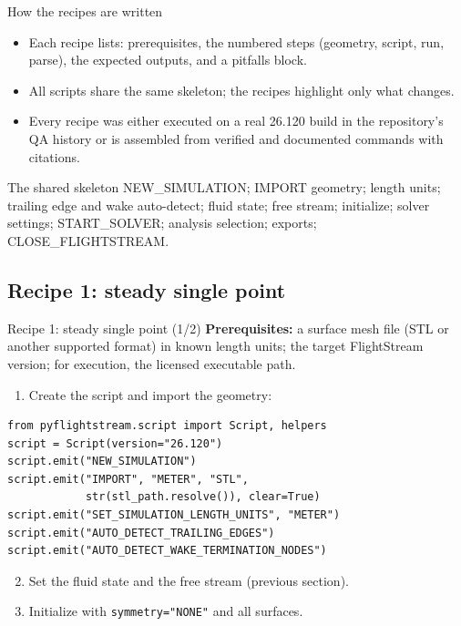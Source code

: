 \documentclass[aspectratio=169,10pt]{beamer}
\newcommand{\code}[1]{\texttt{\small #1}}
\begin{document}
\begin{frame}{How the recipes are written}
  \begin{itemize}
    \item Each recipe lists: prerequisites, the numbered steps (geometry, script, run, parse), the expected outputs, and a pitfalls block.
    \item All scripts share the same skeleton; the recipes highlight only what changes.
    \item Every recipe was either executed on a real 26.120 build in the repository's QA history or is assembled from verified and documented commands with citations.
  \end{itemize}
  \begin{block}{The shared skeleton}
    NEW\_SIMULATION; IMPORT geometry; length units; trailing edge and wake auto-detect; fluid state; free stream; initialize; solver settings; START\_SOLVER; analysis selection; exports; CLOSE\_FLIGHTSTREAM.
  \end{block}
\end{frame}

\subsection{Recipe 1: steady single point}

\begin{frame}[fragile]{Recipe 1: steady single point (1/2)}
  \textbf{Prerequisites:} a surface mesh file (STL or another supported format) in known length units; the target FlightStream version; for execution, the licensed executable path.
  \begin{enumerate}
    \item Create the script and import the geometry:
  \end{enumerate}
\begin{lstlisting}
from pyflightstream.script import Script, helpers
script = Script(version="26.120")
script.emit("NEW_SIMULATION")
script.emit("IMPORT", "METER", "STL",
            str(stl_path.resolve()), clear=True)
script.emit("SET_SIMULATION_LENGTH_UNITS", "METER")
script.emit("AUTO_DETECT_TRAILING_EDGES")
script.emit("AUTO_DETECT_WAKE_TERMINATION_NODES")
\end{lstlisting}
  \begin{enumerate}
    \setcounter{enumi}{1}
    \item Set the fluid state and the free stream (previous section).
    \item Initialize with \code{symmetry="NONE"} and all surfaces.
  \end{enumerate}
\end{frame}
\end{document}
